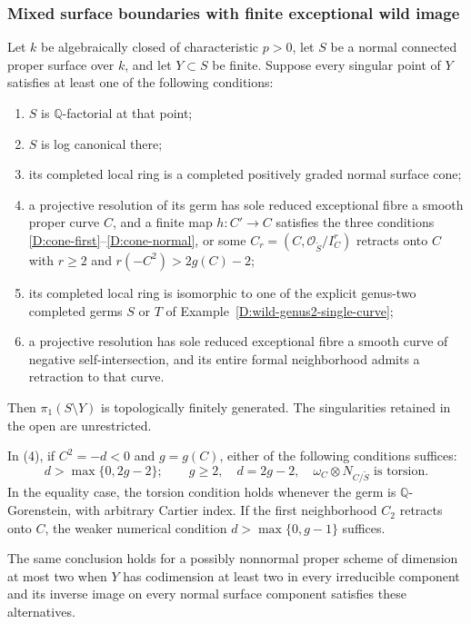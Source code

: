 \subsubsection{Mixed surface boundaries with finite exceptional wild image}

\begin{theorem}
\label{D:finite-cone-mixed-boundary}
Let $k$ be algebraically closed of characteristic $p>0$, let
$S$ be a normal connected proper surface over $k$, and let
$Y\subset S$ be finite.  Suppose every singular point of $Y$
satisfies at least one of the following conditions:
\begin{enumerate}
\item $S$ is $\mathbb Q$-factorial at that point;
\item $S$ is log canonical there;
\item its completed local ring is a completed positively graded
      normal surface cone;
\item a projective resolution of its germ has sole reduced
      exceptional fibre a smooth proper curve $C$, and a finite
      map $h:C'\to C$ satisfies the three conditions
      \eqref{D:cone-first}--\eqref{D:cone-normal}, or some
      $C_r=(C,\mathcal O_{\widetilde S}/I_C^r)$ retracts onto
      $C$ with $r\geq2$ and $r(-C^2)>2g(C)-2$;
\item its completed local ring is isomorphic to one of the
      explicit genus-two completed germs $S$ or $T$ of
      Example~\ref{D:wild-genus2-single-curve};
\item a projective resolution has sole reduced exceptional
      fibre a smooth curve of negative self-intersection, and
      its entire formal neighborhood admits a retraction to
      that curve.
\end{enumerate}
Then $\pi_1(S\setminus Y)$ is topologically finitely generated.
The singularities retained in the open are unrestricted.

In (4), if $C^2=-d<0$ and $g=g(C)$, either of the following
conditions suffices:
\[
 d>\max\{0,2g-2\};\qquad
 g\geq2,\quad d=2g-2,\quad
 \omega_C\otimes N_{C/\widetilde S}\text{ is torsion}.
\]
In the equality case, the torsion condition holds whenever
the germ is $\mathbb Q$-Gorenstein, with arbitrary Cartier index.
If the first neighborhood $C_2$ retracts onto $C$, the weaker
numerical condition $d>\max\{0,g-1\}$ suffices.

The same conclusion holds for a possibly nonnormal proper
scheme of dimension at most two when $Y$ has codimension at
least two in every irreducible component and its inverse image
on every normal surface component satisfies these alternatives.
\end{theorem}
